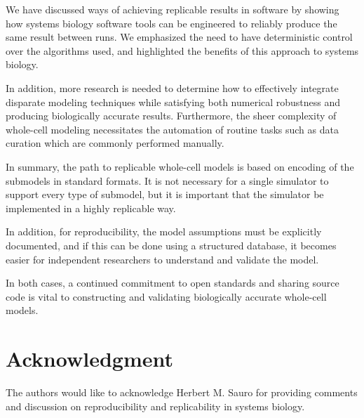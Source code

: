 \documentclass[journal,transmag,twoside]{IEEEtran}
\begin{document}
We have discussed ways of achieving replicable results in software by showing how
systems biology software tools can be engineered to reliably produce the same result
between runs. We emphasized the need to have deterministic control over the algorithms
used, and highlighted the benefits of this approach to systems biology.

In addition, more research is needed to determine how to effectively integrate disparate
modeling techniques while satisfying both numerical robustness and producing
biologically accurate results. Furthermore, the sheer complexity of whole-cell modeling necessitates 
the automation of routine tasks such as data curation which are commonly performed manually.

In summary, the path to replicable whole-cell models is based on
encoding of the submodels in standard formats. It is not necessary for a single simulator
to support every type of submodel, but it is important that the simulator
be implemented in a highly replicable way.

In addition, for reproducibility, the model assumptions must be explicitly
documented, and if this can be done using a structured database,
it becomes easier for independent researchers to understand and validate the model.

In both cases, a continued commitment to open standards and sharing source code is vital
to constructing and validating biologically accurate whole-cell models.

\section{Acknowledgment}

The authors would like to acknowledge Herbert M. Sauro for providing comments and discussion
on reproducibility and replicability in systems biology.


\ifCLASSOPTIONcaptionsoff
  \newpage
\fi



\end{document}
